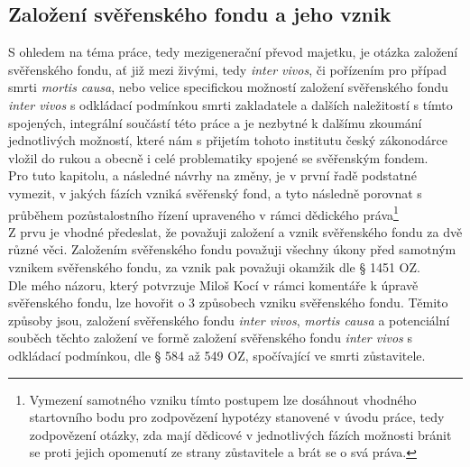 \documentclass{article}
\begin{document}
\newpage
\thispagestyle{smallertextinheader}

\subsection{Založení svěřenského fondu a jeho vznik}

S ohledem na téma práce, tedy mezigenerační převod majetku, je otázka založení svěřenského fondu, ať již mezi živými, tedy \textit{inter vivos}, či pořízením pro případ smrti \textit{mortis causa}, nebo velice specifickou možností založení svěřenského fondu \textit{inter vivos} s odkládací podmínkou smrti zakladatele a dalších naležitostí s tímto spojených, integrální součástí této práce a je nezbytné k dalšímu zkoumání jednotlivých možností, které nám s přijetím tohoto institutu český zákonodárce vložil do rukou a obecně i celé problematiky spojené se svěřenským fondem. \\

Pro tuto kapitolu, a následné návrhy na změny, je v první řadě podstatné vymezit,  v jakých fázích vzniká svěřenský fond, a tyto následně porovnat s průběhem pozůstalostního řízení upraveného v rámci dědického práva\footnote{Vymezení samotného vzniku tímto postupem lze dosáhnout vhodného startovního bodu pro zodpovězení hypotézy stanovené v úvodu práce, tedy zodpovězení otázky, zda mají dědicové v jednotlivých fázích možnosti bránit se proti jejich opomenutí ze strany zůstavitele a brát se o svá práva.} \\ 

Z prvu je vhodné předeslat, že považuji založení a vznik svěřenského fondu za dvě různé věci. Založením svěřenského fondu považuji všechny úkony před samotným vznikem svěřenského fondu, za vznik pak považuji okamžik dle § 1451 OZ.\\

Dle mého názoru, který potvrzuje Miloš Kocí v rámci komentáře k úpravě svěřenského fondu, lze hovořit o 3 způsobech vzniku svěřenského fondu. Těmito způsoby jsou, založení svěřenského fondu \textit{inter vivos}, \textit{mortis causa} a potenciální souběch těchto založení ve formě založení svěřenského fondu \textit{inter vivos} s odkládací podmínkou, dle § 584 až 549 OZ, spočívající ve smrti zůstavitele. \\


\end{document}
